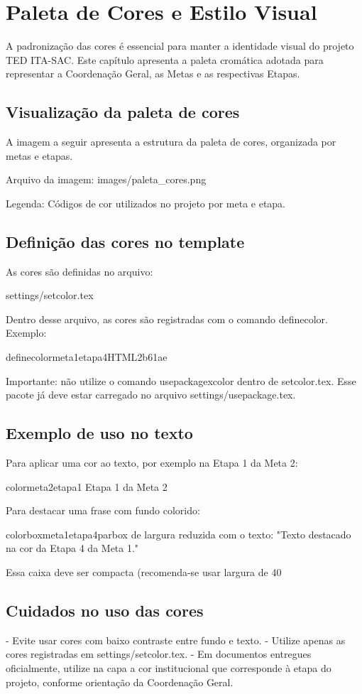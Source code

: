 \chapter{Paleta de Cores e Estilo Visual}

A padronização das cores é essencial para manter a identidade visual do projeto TED ITA-SAC. Este capítulo apresenta a paleta cromática adotada para representar a Coordenação Geral, as Metas e as respectivas Etapas.

\section{Visualização da paleta de cores}

A imagem a seguir apresenta a estrutura da paleta de cores, organizada por metas e etapas.

Arquivo da imagem: images/paleta\_cores.png


Legenda: Códigos de cor utilizados no projeto por meta e etapa.


\section{Definição das cores no template}

As cores são definidas no arquivo:

settings/setcolor.tex

Dentro desse arquivo, as cores são registradas com o comando definecolor. Exemplo:

definecolor{meta1etapa4}{HTML}{2b61ae}

Importante: não utilize o comando usepackage{xcolor} dentro de setcolor.tex. Esse pacote já deve estar carregado no arquivo settings/usepackage.tex.

\section{Exemplo de uso no texto}

Para aplicar uma cor ao texto, por exemplo na Etapa 1 da Meta 2:

{color{meta2etapa1} Etapa 1 da Meta 2}

Para destacar uma frase com fundo colorido:

colorbox{meta1etapa4}{parbox de largura reduzida com o texto: "Texto destacado na cor da Etapa 4 da Meta 1."}

Essa caixa deve ser compacta (recomenda-se usar largura de 40%

\section{Cuidados no uso das cores}

- Evite usar cores com baixo contraste entre fundo e texto.
- Utilize apenas as cores registradas em settings/setcolor.tex.
- Em documentos entregues oficialmente, utilize na capa a cor institucional que corresponde à etapa do projeto, conforme orientação da Coordenação Geral.
